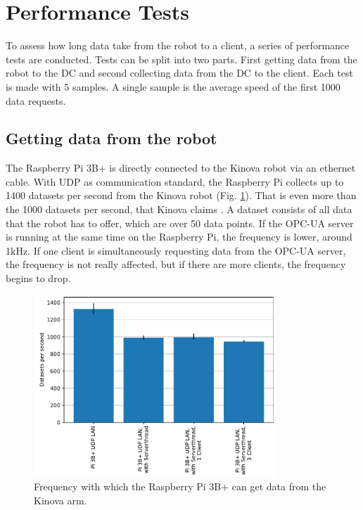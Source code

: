 \documentclass[conference]{IEEEtran}
\begin{document}
\section{Performance Tests}
To assess how long data take from the robot to a client, a series of performance tests are conducted.
Tests can be split into two parts. 
First getting  data from the robot to the DC and second collecting  data from the DC to the client.
Each test is made with 5 samples. A single sample is the average speed of the first 1000 data requests.
\subsection{Getting data from the robot}
The Raspberry Pi 3B+ is directly connected to the Kinova robot via an ethernet cable.
With UDP as communication standard, the Raspberry Pi collects  up to 1400 datasets per second from the Kinova robot (Fig. \ref{fig:KortexAPISpeed}).
That is even more than the 1000 datasets per second, that Kinova claims \cite{KortexUDP}. A dataset consists of all  data that the robot has to offer, which are over 50 data points.
If the OPC-UA server is running at the same time on the Raspberry Pi, the frequency is lower, around 1kHz.
If one client is simultaneously requesting data from the OPC-UA server, the frequency is not really affected, but if there are more clients, the frequency begins to drop.

\begin{figure}[htbp]
    \centerline{\includegraphics[width=9.1cm]{Pictures/KortexAPISpeed.pdf}}
    \caption{Frequency with which the Raspberry Pi 3B+ can get data from the Kinova arm.}
    \label{fig:KortexAPISpeed}
\end{figure}
\end{document}

